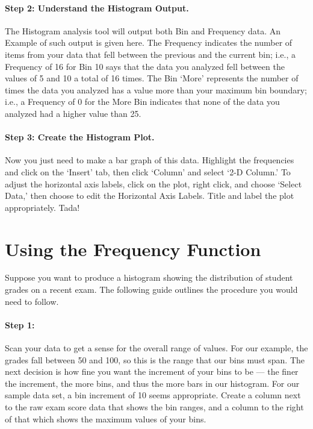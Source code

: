 \paragraph{Step 2: Understand the Histogram Output.} 
The Histogram analysis tool will output both Bin and Frequency data. 
An Example of such output is given here. 
The Frequency indicates the number of items from your data that fell between the previous and the current bin; i.e., a Frequency of 16 for Bin 10 says that the data you analyzed fell between the values of 5 and 10 a total of 16 times. 
The Bin `More' represents the number of times the data you analyzed has a value more than your maximum bin boundary; i.e., a Frequency of 0 for the More Bin indicates that none of the data you analyzed had a higher value than 25.
\paragraph{Step 3: Create the Histogram Plot.} 
Now you just need to make a bar graph of this data. 
Highlight the frequencies and click on the `Insert' tab, then click `Column' and select `2-D Column.' 
To adjust the horizontal axis labels, click on the plot, right click, and choose `Select Data,' then choose to edit the Horizontal Axis Labels. 
Title and label the plot appropriately. Tada!
%
\section{Using the Frequency Function}
Suppose you want to produce a histogram showing the distribution of student grades on a recent exam. 
The following guide outlines the procedure you would need to follow. 
\paragraph{Step 1:} Scan your data to get a sense for the overall range of values. 
For our example, the grades fall between 50 and 100, so this is the range that our bins must span. 
The next decision is how fine you want the increment of your bins to be — the finer the increment, the more bins, and thus the more bars in our histogram. 
For our sample data set, a bin increment of 10 seems appropriate. 
Create a column next to the raw exam score data that shows the bin ranges, and a column to the right of that which shows the maximum values of your bins. 
